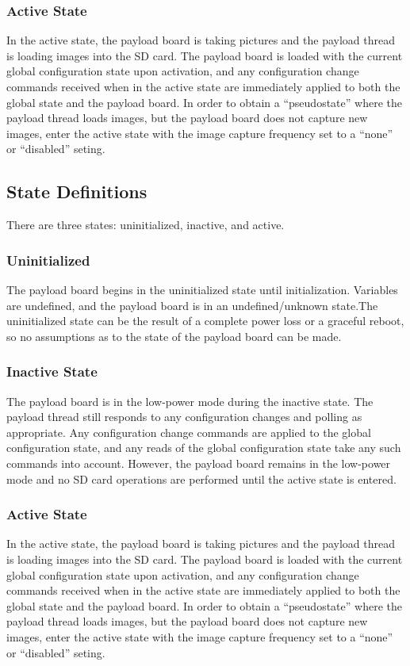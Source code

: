 \documentclass{article}
\begin{document}
\subsubsection{Active State}
In the active state, the payload board is taking pictures and the payload thread
is loading images into the SD card. The payload board is loaded with the current
global configuration state upon activation, and any configuration change
commands received when in the active state are immediately applied to both
the global state and the payload board.
In order to obtain a 
``pseudostate'' where the payload thread loads images, but the payload board
does not capture new images, enter the active state with the image capture
frequency set to a ``none'' or ``disabled'' seting.

\subsection{State Definitions}
There are three states: uninitialized, inactive, and active.

\subsubsection{Uninitialized}
The payload board begins in the uninitialized state until initialization.
Variables are undefined, and the payload board is in an undefined/unknown state.The uninitialized state can be the result of a complete power loss or a graceful
reboot, so no assumptions as to the state of the payload board can be made.

\subsubsection{Inactive State}
The payload board is in the low-power mode during the inactive state. The
payload thread still responds to any configuration changes and polling as
appropriate. Any configuration change commands are applied to the global
configuration state, and any reads of the global configuration state take any
such
commands into account. However, the payload board remains in the low-power mode
and no SD card operations are performed until the active state is entered.

\subsubsection{Active State}
In the active state, the payload board is taking pictures and the payload thread
is loading images into the SD card. The payload board is loaded with the current
global configuration state upon activation, and any configuration change
commands received when in the active state are immediately applied to both
the global state and the payload board.
In order to obtain a 
``pseudostate'' where the payload thread loads images, but the payload board
does not capture new images, enter the active state with the image capture
frequency set to a ``none'' or ``disabled'' seting.
\end{document}
